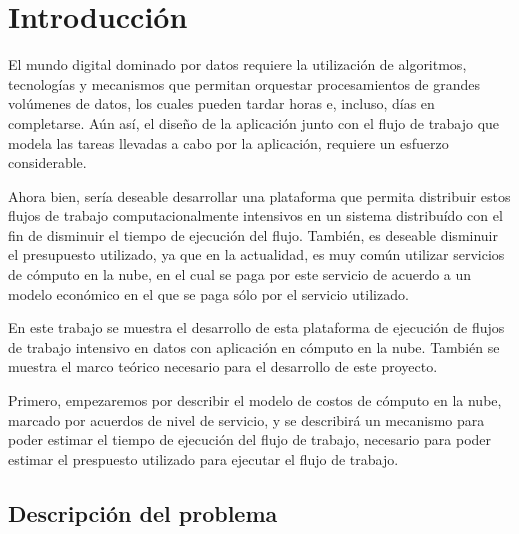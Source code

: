 \chapter{Introducción}

El mundo digital dominado por datos requiere la utilización de algoritmos, tecnologías y mecanismos que permitan orquestar procesamientos de grandes volúmenes de datos, los cuales pueden tardar horas e, incluso, días en completarse. Aún así, el diseño de la aplicación junto con el flujo de trabajo que modela las tareas llevadas a cabo por la aplicación, requiere un esfuerzo considerable.

Ahora bien, sería deseable desarrollar una plataforma que permita distribuir estos flujos de trabajo computacionalmente intensivos en un sistema distribuído con el fin de disminuir el tiempo de ejecución del flujo. También, es deseable disminuir el presupuesto utilizado, ya que en la actualidad, es muy común utilizar servicios de cómputo en la nube, en el cual se paga por este servicio de acuerdo a un modelo económico en el que se paga sólo por el servicio utilizado.

En este trabajo se muestra el desarrollo de esta plataforma de ejecución de flujos de trabajo intensivo en datos con aplicación en cómputo en la nube. También se muestra el marco teórico necesario para el desarrollo de este proyecto.

Primero, empezaremos por describir el modelo de costos de cómputo en la nube, marcado por acuerdos de nivel de servicio, y se describirá un mecanismo para poder estimar el tiempo de ejecución del flujo de trabajo, necesario para poder estimar el prespuesto utilizado para ejecutar el flujo de trabajo. 



\section{Descripción del problema}

